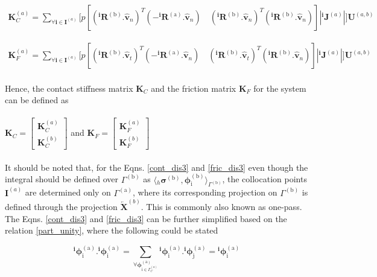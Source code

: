  \begin{multline}\label{cont_dis3}
\mathbf{K}^{(a)}_C =
\sum_{\forall \bm i \in \bm I^{(a)}} \big[ p[({}^{\bm i} \mathbf{R}^{\mathrm{(b)}}.\bm{\hat{v}}_n)^T(- {}^{\bm i} \mathbf{R}^{\mathrm{(a)}}.\bm{\hat{v}}_n) \quad({}^{\bm i} \mathbf{R}^{\mathrm{(b)}}.\bm{\hat{v}}_n)^T({}^{\bm i} \mathbf{R}^{\mathrm{(b)}}.\bm{\hat{v}}_n)] |{}^{\bm i} \bm J^{(a)}| \big] \bm U^{(a,b)} 
\end{multline}

\begin{multline}\label{fric_dis3}
\mathbf{K}^{(a)}_F =
\sum_{\forall \bm i \in \bm I^{(a)}} \big[ p[({}^{\bm i} \mathbf{R}^{\mathrm{(b)}}.\bm{\hat{v}}_t)^T(- {}^{\bm i} \mathbf{R}^{\mathrm{(a)}}.\bm{\hat{v}}_n) \quad({}^{\bm i} \mathbf{R}^{\mathrm{(b)}}.\bm{\hat{v}}_t)^T({}^{\bm i} \mathbf{R}^{\mathrm{(b)}}.\bm{\hat{v}}_n)] |{}^{\bm i} \bm J^{(a)}| \big] \bm U^{(a,b)} 
\end{multline}\\

Hence, the contact stiffness matrix $\mathbf{K}_C$ and the friction matrix $\mathbf{K}_F$ for the system can be defined as \\
\\
$\mathbf{K}_C=
\begin{bmatrix}
\mathbf{K}^{(a)}_C\\
\mathbf{K}^{(b)}_C
\end{bmatrix}$
and 
$\mathbf{K}_F=
\begin{bmatrix}
\mathbf{K}^{(a)}_F\\
\mathbf{K}^{(b)}_F
\end{bmatrix}$\\
\\
It should be noted that, for the Eqns. \eqref{cont_dis3} and \eqref{fric_dis3} even though the integral should be defined over $\Gamma^{\mathrm{(b)}}$ as $\langle {}_h\bm{\sigma}^{\mathrm{(b)}},  \bm \phi^{\mathrm{(b)}}_{\mathrm{i}} \rangle_{ \Gamma^{(\mathrm{b})}}$, the collocation points ${\bm I^{(a)}}$ are determined only on $\Gamma^{\mathrm{(a)}}$, 
where its corresponding projection on $\Gamma^{\mathrm{(b)}}$ is defined through the projection  $\overleftarrow{\bm X}^{(b)}$. 
This is commonly also known as one-pass.  The Eqns. \eqref{cont_dis3} and \eqref{fric_dis3} can be further simplified based on the relation \eqref{part_unity}, where the following could be stated

\begin{equation}
{}^{\bm i} \bm \phi^{(\mathrm{a})}_{\mathrm{i}}. {}^{\bm i} \bm \phi^{(\mathrm{a})}_{\mathrm{i}} = \sum_{\forall \bm \phi^{\mathrm{(a)}}_{\mathrm{i}\in \Gamma_C^{(a)}}} {}^{\bm i} \bm \phi^{(\mathrm{a})}_{\mathrm{i}}. {}^{\bm i} \bm \phi^{(\mathrm{a})}_{\mathrm{j}} = {}^{\bm i} \bm  \phi^{\mathrm{(a)}}_{\mathrm{i}}
\end{equation}

